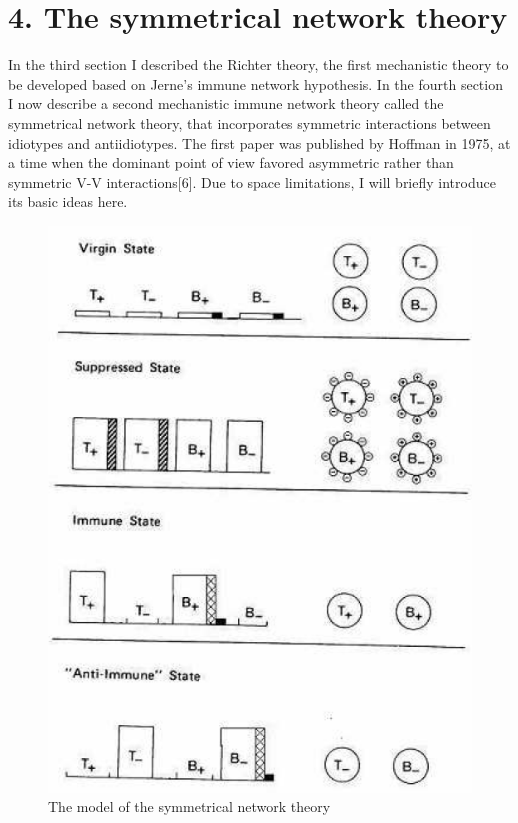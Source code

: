 \documentclass[Proceedings]{ascelike}
\begin{document}
\section{4. The symmetrical network theory}
In the third section I described the Richter theory, the first mechanistic theory to be developed based on Jerne's immune network hypothesis. In the fourth section I now describe a second mechanistic immune network theory called the symmetrical network theory, that incorporates symmetric interactions between idiotypes and antiidiotypes. The first paper was published by Hoffman in 1975, at a time when the dominant point of view favored asymmetric rather than symmetric V-V interactions[6]. Due to space limitations, I will briefly introduce its basic ideas here.
\begin{figure}
\centering
    \includegraphics[scale=0.6] {img/symmetrical_network_theory.png}
    \caption{The model of the symmetrical network theory}
\end{figure}
\end{document}
